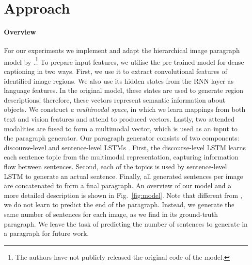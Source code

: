 \documentclass[11pt,a4paper]{article}
\newcommand{\kibitz}[2]{\ifnum\Comments=1\textcolor{#1}{#2}\fi}
\newcommand{\nikolai}[1]{\kibitz{red}   {[Nikolai: #1]}}
\begin{document}
\section{Approach}
\paragraph{Overview}
For our experiments we implement and adapt the hierarchical image paragraph model by \cite{krause2016hierarchical}.\footnote{The authors have not publicly released the original code of the model.}
To prepare input features, we utilise the pre-trained model for dense captioning \cite{densecap} in two ways.
First, we use it to extract convolutional features of identified image regions.
We also use its hidden states from the RNN layer as language features.
In the original model, these states are used to generate region descriptions; therefore, these vectors represent semantic information about objects.
We construct \textit{a multimodal space}, in which we learn mappings from both text and vision features and attend to produced vectors.
Lastly, two attended modalities are fused to form a multimodal vector, which is used as an input to the paragraph generator.
Our paragraph generator consists of two components: discourse-level and sentence-level LSTMs \cite{lstm97}.
First, the discourse-level LSTM learns each sentence topic from the multimodal representation, capturing information flow between sentences.
Second, each of the topics is used by sentence-level LSTM to generate an actual sentence.
Finally, all generated sentences per image are concatenated to form a final paragraph.
An overview of our model and a more detailed description is shown in Fig.~\ref{fig:model}.
Note that different from , we do not learn to predict the end of the paragraph.
Instead, we generate the same number of sentences for each image, as we find in its ground-truth paragraph.
We leave the task of predicting the number of sentences to generate in a paragraph for future work.

\end{document}

